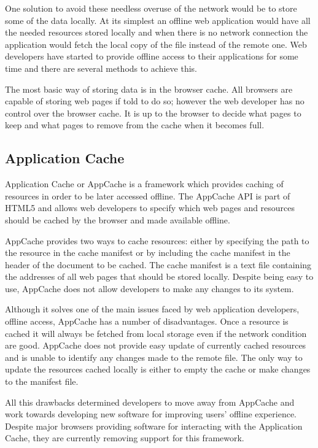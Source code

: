 \documentclass[10pt,a4paper,twoside]{book}
\begin{document}
One solution to avoid these needless overuse of the network would be to store some of the data locally. At its simplest an offline web application would have all the needed resources stored locally and when there is no network connection the application would fetch the local copy of the file instead of the remote one.  Web developers have started to provide offline access to their applications for some time and there are several methods to achieve this.

The most basic way of storing data is in the browser cache. All browsers are capable of storing web pages if told to do so; however the web developer has no control over the browser cache. It is up to the browser to decide what pages to keep and what pages to remove from the cache when it becomes full. 

\subsection{Application Cache}
Application Cache or AppCache is a framework which provides caching of resources in order to be later accessed offline. The AppCache API is part of HTML5 and allows web developers to specify which web pages and resources should be cached by the browser and made available offline.

AppCache provides two ways to cache resources: either by specifying the path to the resource in the cache manifest or by including the cache manifest in the header of the document to be cached. The cache manifest is a text file containing the addresses of all web pages that should be stored locally. Despite being easy to use, AppCache does not allow developers to make any changes to its system. 

Although it solves one of the main issues faced by web application developers, offline access, AppCache has a number of disadvantages. Once a resource is cached it will always be fetched from local storage even if the network condition are good. AppCache does not provide easy update of currently cached resources and is unable to identify any changes made to the remote file. The only way to update the resources cached locally is either to empty the cache or make changes to the manifest file.

All this drawbacks determined developers to move away from AppCache and work towards developing new software for improving users' offline experience. Despite major browsers providing software for interacting with the Application Cache, they are currently removing support for this framework.
\end{document}
